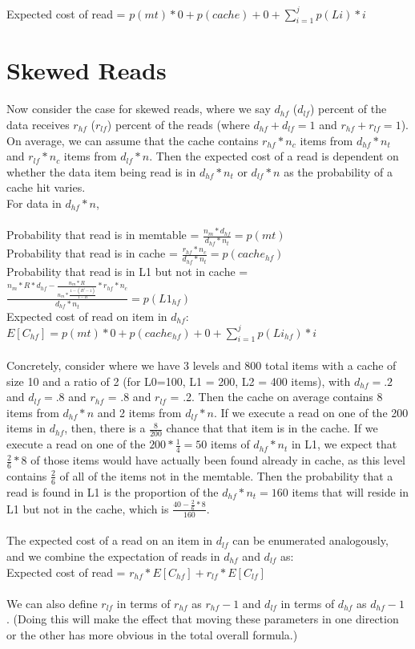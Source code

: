 \documentclass[11pt]{article}
\theoremstyle{plain}
\theoremstyle{definition}
\begin{document}
Expected cost of read = $p(mt) * 0  + p(cache) + 0 + \sum_{i=1}^j p(Li) * i$

\section{Skewed Reads}

Now consider the case for skewed reads, where we say $d_{hf}$ ($d_{lf}$) percent of the data receives $r_{hf}$ ($r_{lf}$) percent of the reads (where $d_{hf} + d_{lf} = 1$ and $r_{hf} + r_{lf} = 1$). On average, we can assume that the cache contains $r_{hf} * n_c$ items from $d_{hf} * n_t$ and $r_{lf} * n_c$ items from $d_{lf} * n$. Then the expected cost of a read is dependent on whether the data item being read is in $d_{hf} * n_t$ or $d_{lf} * n$ as the probability of a cache hit varies.\\
For data in $d_{hf} * n$, \\ \\
Probability that read is in memtable = $\frac{n_m*d_{hf}}{d_{hf} *n_t}  = p(mt)$\\
Probability that read is in cache = $\frac{r_{hf} * n_c}{d_{hf} * n_t} = p(cache_{hf})$ \\
Probability that read is in L1 but not in cache = $ \frac{n_m * R*d_{hf} - \frac{n_m * R}{n_m * \frac{1-(R^j-1)}{1-R}} * r_{hf} * n_c}{d_{hf} * n_t}  = p(L1_{hf})$ \\
Expected cost of read on item in $d_{hf}$: $E[C_{hf}]= p(mt) * 0  + p(cache_{hf}) + 0 + \sum_{i=1}^j p(Li_{hf}) * i$\\ \\
Concretely, consider where we have 3 levels and 800 total items with a cache of size 10 and a ratio of 2  (for L0=100, L1 = 200, L2 = 400 items), with $d_{hf} = .2$ and $d_{lf} = .8$ and $r_{hf}$ = .8 and $r_{lf}$ = .2. Then the cache on average contains 8 items from $d_{hf} * n$ and 2 items from $d_{lf}*n$. If we execute a read on one of the 200 items in $d_{hf}$, then, there is a $\frac{8}{200}$ chance that that item is in the cache. If we execute a read on one of the $200*\frac{1}{4} = 50$ items of  $d_{hf} * n_t$ in L1, we expect that $\frac{2}{6} * 8$ of those items would have actually been found already in cache, as this level contains $\frac{2}{6}$ of all of the items not in the memtable. Then the probability that a read is found in L1 is the proportion of the $d_{hf} * n_t = 160$ items that will reside in L1 but not in the cache, which is $\frac{40 - \frac{2}{6} * 8}{160}$. \\ \\
The expected cost of a read on an item in $d_{lf}$ can be enumerated analogously, and we combine the expectation of reads in $d_{hf}$ and $d_{lf}$ as: \\
Expected cost of read = $r_{hf} * E[C_{hf}] + r_{lf} * E[C_{lf}]$ \\ \\
We can also define $r_{lf}$ in terms of $r_{hf}$ as $r_{hf} - 1$ and  $d_{lf}$ in terms of $d_{hf}$ as $d_{hf} - 1$ . (Doing this will make the effect that moving these parameters in one direction or the other has more obvious in the total overall formula.)
\end{document}

